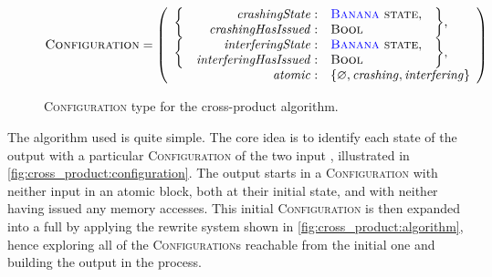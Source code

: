 \begin{figure}
  \begin{displaymath}
    \textsc{Configuration} = \left(\begin{array}{rrll}
      \multirow{2}{*}{\bigg\{} & \mathit{crashingState}: & \textsc{{\STateMachine} state}, & \multirow{2}{*}{\bigg\},}\\
                               & \mathit{crashingHasIssued}: & \textsc{Bool}\\
      \multirow{2}{*}{\bigg\{} & \mathit{interferingState}: & \textsc{{\STateMachine} state}, & \multirow{2}{*}{\bigg\},} \\
                               & \mathit{interferingHasIssued}: & \textsc{Bool}\\
      \multicolumn{2}{r}{\mathit{atomic}:} & \multicolumn{2}{l}{\{ \varnothing, \mathit{crashing}, \mathit{interfering} \}}
    \end{array}\right)
  \end{displaymath}
  \caption{\textsc{Configuration} type for the cross-product algorithm.}
  \label{fig:cross_product:configuration}
\end{figure}

The algorithm used is quite simple.  The core idea is to identify each
state of the output {\StateMachine} with a particular
\textsc{Configuration} of the two input {\StateMachines}, illustrated
in \autoref{fig:cross_product:configuration}.  The output
{\StateMachine} starts in a \textsc{Configuration} with neither input
{\StateMachine} in an atomic block, both {\StateMachines} at their
initial state, and with neither having issued any memory accesses.
This initial \textsc{Configuration} is then expanded into a full
{\StateMachine} by applying the rewrite system shown in
\autoref{fig:cross_product:algorithm}, hence exploring all of the
\textsc{Configuration}s reachable from the initial one and building
the output {\StateMachine} in the process.

